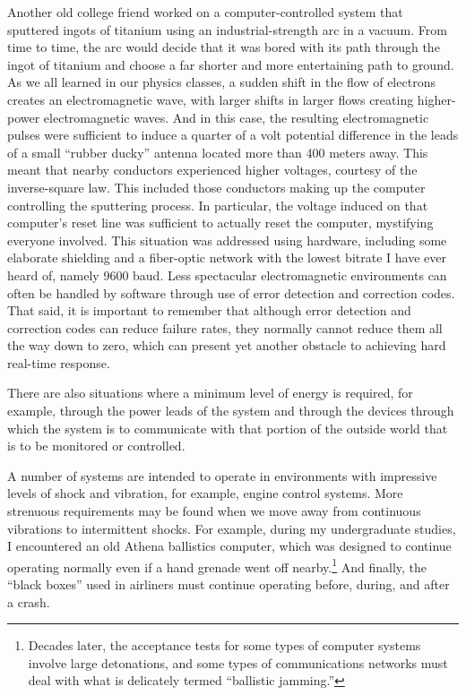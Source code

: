 Another old college friend worked on a computer-controlled system
that sputtered ingots of titanium using an industrial-strength arc
in a vacuum.
From time to time, the arc would decide that it was bored with its path
through the ingot of titanium and choose a far shorter and more
entertaining path to ground.
As we all learned in our physics classes, a sudden shift in the flow of
electrons creates an electromagnetic wave, with larger shifts in larger
flows creating higher-power electromagnetic waves.
And in this case, the resulting electromagnetic pulses were sufficient
to induce a quarter of a volt potential difference in the leads of
a small ``rubber ducky'' antenna located more than 400 meters away.
This meant that nearby conductors experienced higher voltages, courtesy
of the inverse-square law.
This included those conductors making up the computer controlling the
sputtering process.
In particular, the voltage induced on that computer's reset line was
sufficient to actually reset the computer, mystifying everyone involved.
This situation was addressed using hardware, including some elaborate
shielding and a fiber-optic network with the lowest bitrate I have ever
heard of, namely 9600 baud.
Less spectacular electromagnetic environments can often be handled by
software through use of error detection and correction codes.
That said, it is important to remember that although error detection and
correction codes can reduce failure rates, they normally cannot reduce
them all the way down to zero, which can present yet another obstacle
to achieving hard real-time response.

There are also situations where a minimum level of energy
is required, for example, through the power leads of the system and
through the devices through which the system is to communicate with
that portion of the outside world that is to be monitored or controlled.

\QuickQuizEnd

A number of systems are intended to operate in environments with impressive
levels of shock and vibration, for example, engine control systems.
More strenuous requirements may be found when we move away from
continuous vibrations to intermittent shocks.
For example, during my undergraduate studies, I encountered an old Athena
ballistics computer, which was designed to continue operating normally even if
a hand grenade went off nearby.\footnote{
	Decades later, the acceptance tests for some types of computer
	systems involve large detonations, and some types of
	communications networks must deal with what is delicately
	termed ``ballistic jamming.''}
And finally, the ``black boxes'' used in airliners must continue operating
before, during, and after a crash.

